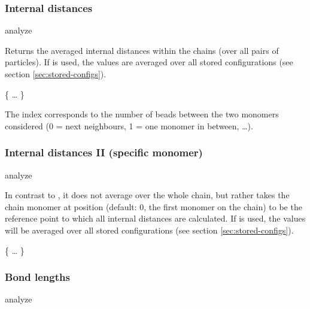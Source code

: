 \subsubsection{Internal distances}
\begin{essyntax}
 analyze  
\end{essyntax}
Returns the averaged internal distances within the chains (over
all pairs of particles).  
If  is used, the values are averaged over all stored
configurations (see section \vref{sec:stored-configs}).
\begin{code}
\{   \dots {} \}
\end{code}
The index corresponds to the number of beads between the two monomers
considered (0 = next neighbours, 1 = one monomer in between, \dots).

\subsubsection{Internal distances II (specific monomer)}

\begin{essyntax}
  analyze   
\end{essyntax}
In contrast to , it does not average over
the whole chain, but rather takes the chain monomer at position
 (default: $0$, \ie the first monomer on the chain) to be
the reference point to which all internal distances are calculated. If
 is used, the values will be averaged over all stored
configurations (see section \vref{sec:stored-configs}).

\begin{code}
\{   \dots {} \}
\end{code}

\subsubsection{Bond lengths}
\begin{essyntax}
  analyze  
\end{essyntax}

